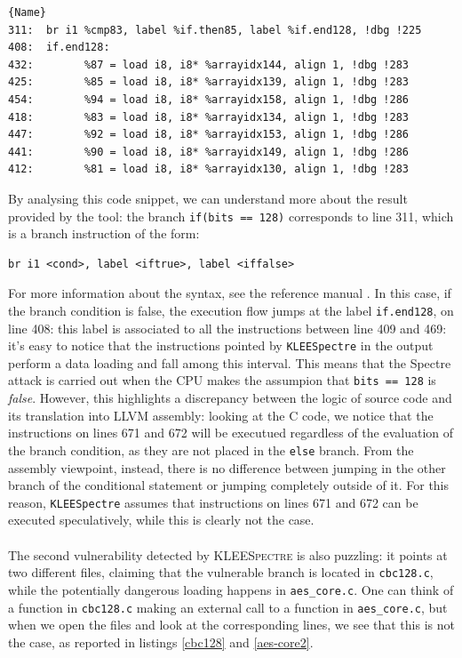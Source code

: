 \documentclass[12pt,a4paper]{book}
\theoremstyle{definition}
\begin{document}
	\lstset{numbers=none}
	\begin{lstlisting}[caption=\texttt{assembly.ll} (for AES-CBC), label=asm1]{Name}
311:  br i1 %cmp83, label %if.then85, label %if.end128, !dbg !225
408:  if.end128:                                        
432:  		%87 = load i8, i8* %arrayidx144, align 1, !dbg !283
425:  		%85 = load i8, i8* %arrayidx139, align 1, !dbg !283
454:  		%94 = load i8, i8* %arrayidx158, align 1, !dbg !286
418:  		%83 = load i8, i8* %arrayidx134, align 1, !dbg !283
447:  		%92 = load i8, i8* %arrayidx153, align 1, !dbg !286
441:  		%90 = load i8, i8* %arrayidx149, align 1, !dbg !286
412:  		%81 = load i8, i8* %arrayidx130, align 1, !dbg !283
	\end{lstlisting}
	\vspace{3mm}
	
	By analysing this code snippet, we can understand more about the result provided by the tool: the branch \texttt{if(bits == 128)} corresponds to line 311, which is a branch instruction of the form:
	
	\begin{lstlisting}[frame=none]
	br i1 <cond>, label <iftrue>, label <iffalse>
	\end{lstlisting}

	For more information about the syntax, see the reference manual \cite{LLVMasm}. In this case, if the branch condition is false, the execution flow jumps at the label \texttt{if.end128}, on line 408: this label is associated to all the instructions between line 409 and 469: it's easy to notice that the instructions pointed by \texttt{KLEESpectre} in the output perform a data loading and fall among this interval. This means that the Spectre attack is carried out when the CPU makes the assumpion that \texttt{bits == 128} is \textit{false}. However, this highlights a discrepancy between the logic of source code and its translation into LLVM assembly: looking at the C code, we notice that the instructions on lines 671 and 672 will be executued regardless of the evaluation of the branch condition, as they are not placed in the \texttt{else} branch. From the assembly viewpoint, instead, there is no difference between jumping in the other branch of the conditional statement or jumping completely outside of it. For this reason, \texttt{KLEESpectre} assumes that instructions on lines 671 and 672 can be executed speculatively, while this is clearly not the case.
	\paragraph{}The second vulnerability detected by \textsc{KLEESpectre} is also puzzling: it points at two different files, claiming that the vulnerable branch is located in \texttt{cbc128.c}, while the potentially dangerous loading happens in \texttt{aes\_core.c}. One can think of a function in \texttt{cbc128.c} making an external call to a function in \texttt{aes\_core.c}, but when we open the files and look at the corresponding lines, we see that this is not the case, as reported in listings \ref{cbc128} and \ref{aes-core2}.
	
\end{document}

